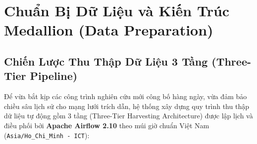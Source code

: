 
\chapter{Chuẩn Bị Dữ Liệu và Kiến Trúc Medallion (Data Preparation)}
\label{chap:data_preparation}

\section{Chiến Lược Thu Thập Dữ Liệu 3 Tầng (Three-Tier Pipeline)}

Để vừa bắt kịp các công trình nghiên cứu mới công bố hàng ngày, vừa đảm bảo chiều sâu lịch sử cho mạng lưới trích dẫn, hệ thống xây dựng quy trình thu thập dữ liệu tự động gồm 3 tầng (Three-Tier Harvesting Architecture) được lập lịch và điều phối bởi \textbf{Apache Airflow 2.10} theo múi giờ chuẩn Việt Nam (\texttt{Asia/Ho\_Chi\_Minh - ICT}):

